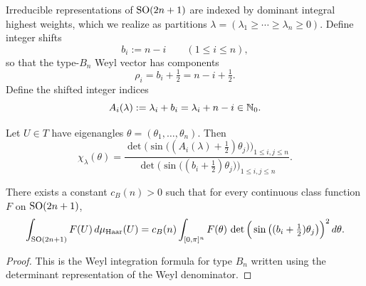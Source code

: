 Irreducible representations of $\mathrm{SO}(2n+1)$ are indexed by dominant integral highest weights,
which we realize as partitions $\lambda=(\lambda_1\ge\cdots\ge\lambda_n\ge 0)$.
Define integer shifts
\begin{equation}
\label{eq:SO_odd_bi_int}
 b_i:=n-i\qquad(1\le i\le n),
\end{equation}
so that the type-$B_n$ Weyl vector has components
\begin{equation}
\label{eq:SO_odd_rho}
\rho_i=b_i+\tfrac12=n-i+\tfrac12.
\end{equation}
Define the shifted integer indices
\begin{equation}
\label{eq:SO_odd_Ai}
A_i(\lambda):=\lambda_i+b_i=\lambda_i+n-i\in\mathbb N_0.
\end{equation}

\begin{lemma}
\label{lem:SOodd_character_sine}
Let $U\in T$ have eigenangles $\theta=(\theta_1,\dots,\theta_n)$.
Then
\begin{equation}
\label{eq:SOodd_character_formula}
\chi_{\lambda}(\theta)
=\frac{\det\Big(\sin\big((A_i(\lambda)+\tfrac12)\theta_j\big)\Big)_{1\le i,j\le n}}
        {\det\Big(\sin\big((b_i+\tfrac12)\theta_j\big)\Big)_{1\le i,j\le n}}.
\end{equation}
\end{lemma}

\begin{lemma}
\label{lem:SOodd_weyl_integration}
There exists a constant $c_{B}(n)>0$ such that for every continuous class function $F$ on $\mathrm{SO}(2n+1)$,
\begin{equation}
\label{eq:SOodd_weyl_integration}
\int_{\mathrm{SO}(2n+1)}F(U)\,d\mu_{\mathrm{Haar}}(U)
= c_{B}(n)\int_{[0,\pi]^n}F(\theta)\,\det\Big(\sin\big((b_i+\tfrac12)\theta_j\big)\Big)^2\,d\theta.
\end{equation}
\end{lemma}

\begin{proof}
This is the Weyl integration formula for type $B_n$ written using the determinant representation of the Weyl denominator.
\end{proof}

